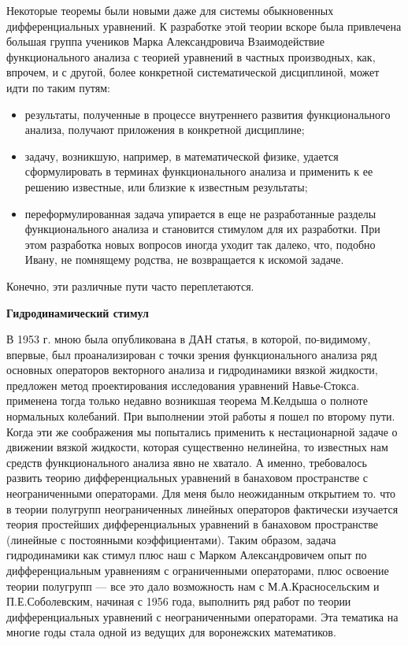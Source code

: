 Некоторые теоремы были новыми даже для системы обыкновенных дифференциальных уравнений. К разработке этой теории вскоре была привлечена большая группа учеников Марка Александровича Взаимодействие функционального анализа с теорией уравнений в частных производных, как, впрочем, и с другой, более конкретной систематической дисциплиной, может идти по таким путям:
\begin{itemize}
	\item
		результаты,   полученные   в процессе внутреннего развития функционального анализа, получают приложения в конкретной дисциплине;
	\item
		задачу, возникшую, например, в математической физике, удается
	 сформулировать в терминах функционального анализа и применить к ее решению известные, или близкие к известным результаты;
	\item
		переформулированная задача упирается в еще не разработанные разделы функционального анализа и становится стимулом для их разработки. При этом разработка новых вопросов иногда уходит так далеко, что, подобно Ивану, не помнящему родства, не возвращается к искомой задаче.
\end{itemize}
Конечно, эти различные пути часто переплетаются.

{\bf Гидродинамический стимул}

В 1953 г. мною была опубликована в ДАН статья, в которой, по-видимому, впервые, был проанализирован с точки зрения функционального анализа ряд основных операторов векторного анализа и гидродинамики вязкой жидкости, предложен метод проектирования исследования уравнений Навье-Стокса. применена тогда только недавно возникшая теорема М.Келдыша о полноте нормальных колебаний. При выполнении этой работы я пошел по второму пути. Когда эти же соображения мы попытались применить к нестационарной задаче о движении вязкой жидкости, которая существенно нелинейна, то известных нам средств функционального анализа явно не хватало. А именно, требовалось развить теорию дифференциальных уравнений в банаховом пространстве с неограниченными операторами. Для меня было неожиданным открытием то. что в теории полугрупп неограниченных линейных операторов фактически изучается теория простейших дифференциальных уравнений в банаховом пространстве (линейные с постоянными коэффициентами). Таким образом, задача гидродинамики как стимул плюс наш с Марком Александровичем опыт по дифференциальным уравнениям с ограниченными операторами, плюс освоение теории полугрупп — все это дало возможность нам с М.А.Красносельским и П.Е.Соболевским, начиная с 1956 года, выполнить ряд работ по теории дифференциальных уравнений с неограниченными операторами. Эта тематика на многие годы стала одной из ведущих для воронежских математиков.

